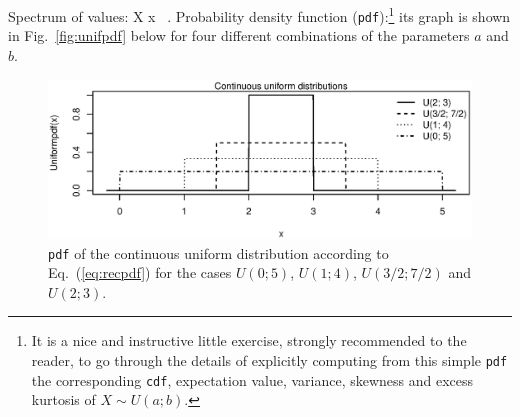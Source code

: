 \medskip
\noindent
Spectrum of values:
%
\be
X \mapsto x \in \left[a,b\right]
\subset {} \ .
\ee
%
Probability density function (\texttt{pdf}):\footnote{It is a nice 
and instructive little exercise, strongly recommended to the 
reader, to go through the details of explicitly computing from 
this simple \texttt{pdf} the corresponding \texttt{cdf}, expectation 
value, variance, skewness and excess kurtosis of $X \sim U(a;b)$.}
%
\be
{}
\ee
%
its graph is shown in Fig.~\ref{fig:unifpdf} below for four
different combinations of the parameters $a$ and $b$.
%
\begin{figure}[!htb]
\begin{center}
\includegraphics[scale=0.8]{unifpdf.eps}
\end{center}
\caption{\texttt{pdf} of the continuous uniform distribution 
according to Eq.~(\ref{eq:recpdf}) for the cases $U(0;5)$, 
$U(1;4)$, $U(3/2;7/2)$ and $U(2;3)$.}
\end{figure}
%

